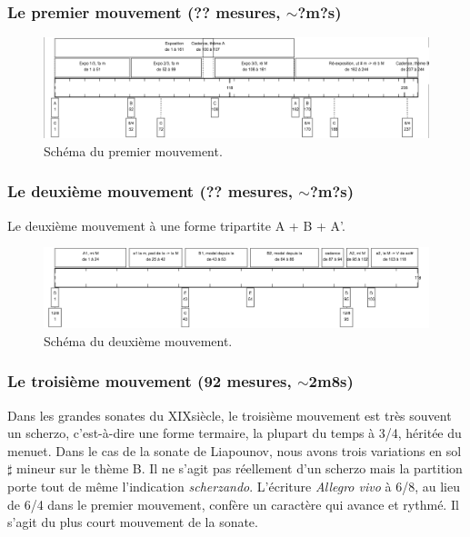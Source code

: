 \newpage

\subsubsection*{Le premier mouvement (?? mesures, $\sim$?m?s)}

\begin{figure}[!ht]
  \begin{bigcenter}
    \includegraphics[width=15cm, keepaspectratio]{frise-mvt1.png}
  \end{bigcenter}
  \caption{\label{schema-3}Schéma du premier mouvement.}
\end{figure}

\subsubsection*{Le deuxième mouvement (?? mesures, $\sim$?m?s)}

Le deuxième mouvement à une forme tripartite A + B + A'.

\begin{figure}[!ht]
  \begin{bigcenter}
    \includegraphics[width=15cm, keepaspectratio]{frise-mvt2.png}
  \end{bigcenter}
  \caption{\label{schema-3}Schéma du deuxième mouvement.}
\end{figure}

\subsubsection*{Le troisième mouvement (92 mesures, $\sim$2m8s)}

Dans les grandes sonates du XIX\ieme siècle, le troisième mouvement est très souvent un scherzo, c'est-à-dire une forme termaire, la plupart du temps à 3/4, héritée du menuet. Dans le cas de la sonate de Liapounov, nous avons trois variations en sol$\sharp$ mineur sur le thème B. Il ne s'agit pas réellement d'un scherzo mais la partition porte tout de même l'indication \emph{scherzando}. L'écriture \emph{Allegro vivo} à 6/8, au lieu de 6/4 dans le premier mouvement, confère un caractère qui avance et rythmé. Il s'agit du plus court mouvement de la sonate.

